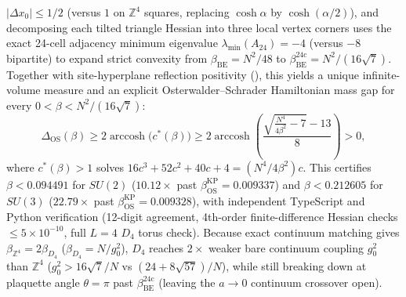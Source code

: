\begin{enumerate}[itemsep=2pt]
$|\Delta x_0| \le 1/2$ (versus $1$ on $\mathbb{Z}^4$ squares, replacing $\cosh\alpha$ by $\cosh(\alpha/2)$), and
decomposing each tilted triangle Hessian into three local vertex corners uses the exact 24-cell adjacency minimum
eigenvalue $\lambda_{\min}(A_{24}) = -4$ (versus $-8$ bipartite) to expand strict convexity from $\beta_{\mathrm{BE}}
= N^2/48$ to $\beta_{\mathrm{BE}}^{\mathrm{24c}} = N^2/(16\sqrt{7})$. Together with site-hyperplane reflection
positivity (), this yields a unique infinite-volume measure and an explicit Osterwalder--Schrader
Hamiltonian mass gap for every $0 < \beta < N^2/(16\sqrt{7})$:
\begin{equation}
\Delta_{\mathrm{OS}}(\beta) \ge 2\operatorname{arccosh}\bigl(c^*(\beta)\bigr)
\ge 2\operatorname{arccosh}\!\left(\frac{\sqrt{\frac{N^4}{4\beta^2} - 7} - 13}{8}\right) > 0,
\label{eq:combes-thomas-gap}
\end{equation}
where $c^*(\beta) > 1$ solves $16 c^3 + 52 c^2 + 40 c + 4 = (N^4 / 4\beta^2) c$. This certifies
$\beta < 0.094491$ for $SU(2)$ (\textbf{$10.12\times$} past $\beta_{\mathrm{OS}}^{\mathrm{KP}} = 0.009337$) and
$\beta < 0.212605$ for $SU(3)$ (\textbf{$22.79\times$} past $\beta_{\mathrm{OS}}^{\mathrm{KP}} = 0.009328$), with
independent TypeScript and Python verification (12-digit agreement, 4th-order finite-difference Hessian checks
$\le 5 \times 10^{-10}$, full $L = 4$ $D_4$ torus check). Because exact continuum matching gives
$\beta_{\mathbb{Z}^4} = 2\beta_{D_4}$ ($\beta_{D_4} = N/g_0^2$), $D_4$ reaches $2\times$ weaker bare continuum
coupling $g_0^2$ than $\mathbb{Z}^4$ ($g_0^2 > 16\sqrt{7}/N$ vs $(24 + 8\sqrt{57})/N$), while still breaking down at
plaquette angle $\theta = \pi$ past $\beta_{\mathrm{BE}}^{\mathrm{24c}}$ (leaving the $a \to 0$ continuum crossover
open).
\end{enumerate}

